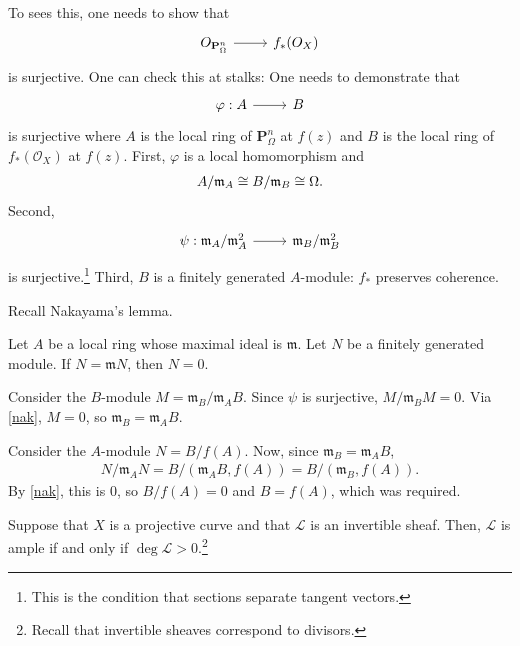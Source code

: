 \documentclass [11 pt, oneside] {article}
\begin{document}
To sees this, one needs to show that
\[
\begin{tikzcd}
	\mathscr{O}_{\mathbf{P}^n_\Omega} \ar[r]& f_*(\mathscr{O}_X)
\end{tikzcd}
\]
is surjective. One can check this at stalks: One needs to demonstrate that 
\[
\begin{tikzcd}
	\varphi: A\ar[r]&B
\end{tikzcd}
\]
is surjective where $A$ is the local ring of $\mathbf{P}^n_\Omega$ at $f(z)$ and $B$ is the local ring of $f_*(\mathscr{O}_X)$ at $f(z)$.
First, $\varphi$ is a local homomorphism and
\begin{align*}
	A/\mathfrak{m}_A \cong B/\mathfrak{m}_B \cong \Omega.
\end{align*}
Second,
\[
\begin{tikzcd}
	\psi:\mathfrak{m}_A/\mathfrak{m}_A^2 \ar[r]&\mathfrak{m}_B/\mathfrak{m}_B^2
\end{tikzcd}
\]
is surjective.\footnote{This is the condition that sections separate tangent vectors.} Third, $B$ is a finitely generated $A$-module: $f_*$ preserves coherence.

Recall Nakayama's lemma.

\begin{lemma}[Nakayama]\label{nak}\text{}
Let $A$ be a local ring whose maximal ideal is $\mathfrak{m}$. Let $N$ be a finitely generated module. If $N = \mathfrak{m}N$, then $N=0$.
\end{lemma}

Consider the $B$-module $M=\mathfrak{m}_B/\mathfrak{m}_A B$. Since $\psi$ is surjective, $M/\mathfrak{m}_BM = 0$. Via \cref{nak}, $M=0$, so $\mathfrak{m}_B = \mathfrak{m}_AB$.

Consider the $A$-module $N = B/f(A)$. Now, since $\mathfrak{m}_B = \mathfrak{m}_AB$,
\begin{align*}
	N/\mathfrak{m}_AN = B/(\mathfrak{m}_AB, f(A)) = B/(\mathfrak{m}_B,f(A)).
\end{align*}
By \cref{nak}, this is $0$, so $B/f(A)=0$ and $B=f(A)$, which was required.

\begin{corollary}[ ]\label{}\text{}
Suppose that $X$ is a projective curve and that $\mathscr{L}$ is an invertible sheaf. Then, $\mathscr{L}$ is ample if and only if $\deg \mathscr{L}>0$.\footnote{Recall that invertible sheaves correspond to divisors.}
\end{corollary}
\end{document}
